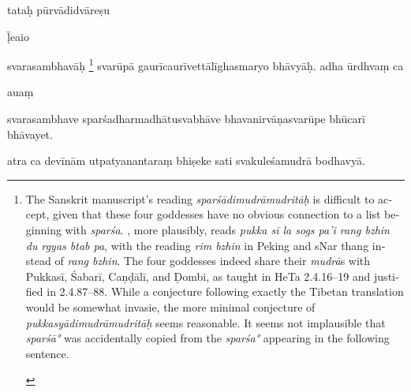 \documentclass[naipra.tex]{subfiles}
\begin{document}
\begin{sanskrit}
\pstart
tataḥ pūrvādidvāreṣu \begin{mantra}ḹ\dsh e\dsh ai\dsh o\end{mantra}\dsh svarasambhavāḥ \footnote{\begin{english}
	The Sanskrit manuscript's reading \emph{sparśādimudrāmudritāḥ} is difficult to accept, given that these four goddesses have no obvious connection to a list beginning with \emph{sparśa}.
	\TIB , more plausibly, reads \emph{pukka sī la sogs pa'i rang bzhin du rgyas btab pa}, with the reading \emph{rim bzhin} in Peking and sNar thang instead of \emph{rang bzhin}.
	The four goddesses indeed share their \emph{mudrā}s with Pukkasī, Śabarī, Caṇḍālī, and Ḍombi, as taught in HeTa 2.4.16–19 and justified in 2.4.87–88.
	While a conjecture following exactly the Tibetan translation would be somewhat invasie, the more minimal conjecture of \emph{pukkasyādimudrāmudritāḥ} seems reasonable.
	It seems not implausible that \emph{sparśā°} was accidentally copied from the \emph{sparśa°} appearing in the following sentence.
\end{english}} svarūpā gaurīcaurīvettālīghasmaryo bhāvyāḥ. 
 adha ūrdhvaṃ ca  \begin{mantra}au\dsh aṃ\end{mantra}\dsh svarasambhave sparśadharmadhātusvabhāve bhavanirvāṇasvarūpe bhūcarī bhāvayet.
\pend


\pstart
atra ca devīnām utpatyanantaraṃ bhiṣeke sati svakuleśamudrā bodhavyā. 
\pend


\end{sanskrit}
\end{document}
